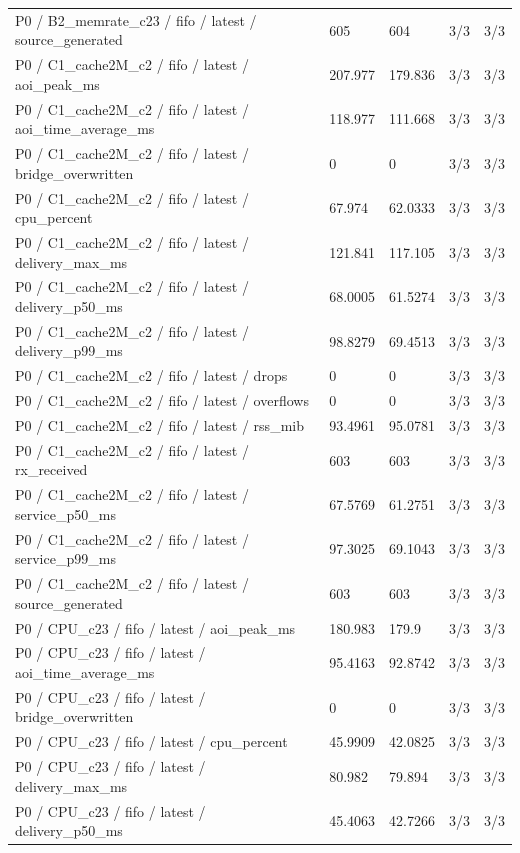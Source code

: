 \begin{tabular}{@{}lllll@{}}
P0 / B2\_memrate\_c23 / fifo / latest / source\_generated & 605 & 604 & 3/3 & 3/3 \\
P0 / C1\_cache2M\_c2 / fifo / latest / aoi\_peak\_ms & 207.977 & 179.836 & 3/3 & 3/3 \\
P0 / C1\_cache2M\_c2 / fifo / latest / aoi\_time\_average\_ms & 118.977 & 111.668 & 3/3 & 3/3 \\
P0 / C1\_cache2M\_c2 / fifo / latest / bridge\_overwritten & 0 & 0 & 3/3 & 3/3 \\
P0 / C1\_cache2M\_c2 / fifo / latest / cpu\_percent & 67.974 & 62.0333 & 3/3 & 3/3 \\
P0 / C1\_cache2M\_c2 / fifo / latest / delivery\_max\_ms & 121.841 & 117.105 & 3/3 & 3/3 \\
P0 / C1\_cache2M\_c2 / fifo / latest / delivery\_p50\_ms & 68.0005 & 61.5274 & 3/3 & 3/3 \\
P0 / C1\_cache2M\_c2 / fifo / latest / delivery\_p99\_ms & 98.8279 & 69.4513 & 3/3 & 3/3 \\
P0 / C1\_cache2M\_c2 / fifo / latest / drops & 0 & 0 & 3/3 & 3/3 \\
P0 / C1\_cache2M\_c2 / fifo / latest / overflows & 0 & 0 & 3/3 & 3/3 \\
P0 / C1\_cache2M\_c2 / fifo / latest / rss\_mib & 93.4961 & 95.0781 & 3/3 & 3/3 \\
P0 / C1\_cache2M\_c2 / fifo / latest / rx\_received & 603 & 603 & 3/3 & 3/3 \\
P0 / C1\_cache2M\_c2 / fifo / latest / service\_p50\_ms & 67.5769 & 61.2751 & 3/3 & 3/3 \\
P0 / C1\_cache2M\_c2 / fifo / latest / service\_p99\_ms & 97.3025 & 69.1043 & 3/3 & 3/3 \\
P0 / C1\_cache2M\_c2 / fifo / latest / source\_generated & 603 & 603 & 3/3 & 3/3 \\
P0 / CPU\_c23 / fifo / latest / aoi\_peak\_ms & 180.983 & 179.9 & 3/3 & 3/3 \\
P0 / CPU\_c23 / fifo / latest / aoi\_time\_average\_ms & 95.4163 & 92.8742 & 3/3 & 3/3 \\
P0 / CPU\_c23 / fifo / latest / bridge\_overwritten & 0 & 0 & 3/3 & 3/3 \\
P0 / CPU\_c23 / fifo / latest / cpu\_percent & 45.9909 & 42.0825 & 3/3 & 3/3 \\
P0 / CPU\_c23 / fifo / latest / delivery\_max\_ms & 80.982 & 79.894 & 3/3 & 3/3 \\
P0 / CPU\_c23 / fifo / latest / delivery\_p50\_ms & 45.4063 & 42.7266 & 3/3 & 3/3 \\

\end{tabular}
